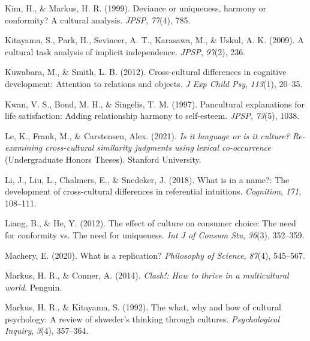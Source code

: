\documentclass[
  man,floatsintext]{apa6}
\newlength{\cslhangindent}
\newlength{\cslentryspacingunit} %
\newenvironment{CSLReferences}[2] %
 {%
  \setlength{\parindent}{0pt}
  \ifodd #1
  \let\oldpar\par
  \def\par{\hangindent=\cslhangindent\oldpar}
  \fi
  \setlength{\parskip}{#2\cslentryspacingunit}
 }%
 {}
\begin{document}
\begin{CSLReferences}{1}{0}
\leavevmode{}%
Kim, H., \& Markus, H. R. (1999). Deviance or uniqueness, harmony or conformity? A cultural analysis. \emph{JPSP}, \emph{77}(4), 785.

\leavevmode{}%
Kitayama, S., Park, H., Sevincer, A. T., Karasawa, M., \& Uskul, A. K. (2009). A cultural task analysis of implicit independence. \emph{JPSP}, \emph{97}(2), 236.

\leavevmode{}%
Kuwabara, M., \& Smith, L. B. (2012). Cross-cultural differences in cognitive development: Attention to relations and objects. \emph{J Exp Child Psy}, \emph{113}(1), 20--35.

\leavevmode{}%
Kwan, V. S., Bond, M. H., \& Singelis, T. M. (1997). Pancultural explanations for life satisfaction: Adding relationship harmony to self-esteem. \emph{JPSP}, \emph{73}(5), 1038.

\leavevmode{}%
Le, K., Frank, M., \& Carstensen, Alex. (2021). \emph{Is it language or is it culture? Re-examining cross-cultural similarity judgments using lexical co-occurrence} (Undergraduate Honors Theses). Stanford University.

\leavevmode{}%
Li, J., Liu, L., Chalmers, E., \& Snedeker, J. (2018). What is in a name?: The development of cross-cultural differences in referential intuitions. \emph{Cognition}, \emph{171}, 108--111.

\leavevmode{}%
Liang, B., \& He, Y. (2012). The effect of culture on consumer choice: The need for conformity vs. The need for uniqueness. \emph{Int J of Consum Stu}, \emph{36}(3), 352--359.

\leavevmode{}%
Machery, E. (2020). What is a replication? \emph{Philosophy of Science}, \emph{87}(4), 545--567.

\leavevmode{}%
Markus, H. R., \& Conner, A. (2014). \emph{Clash!: How to thrive in a multicultural world}. Penguin.

\leavevmode{}%
Markus, H. R., \& Kitayama, S. (1992). The what, why and how of cultural psychology: A review of shweder's thinking through cultures. \emph{Psychological Inquiry}, \emph{3}(4), 357--364.


\end{CSLReferences}
\end{document}
